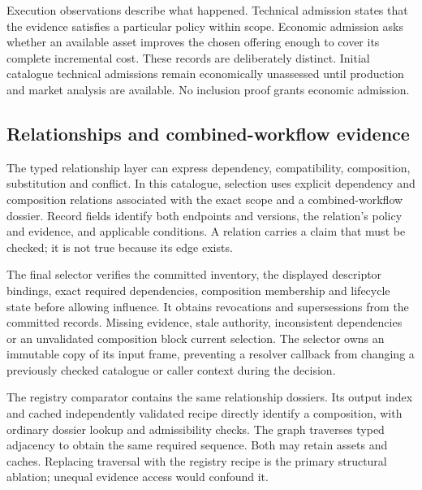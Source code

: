 \documentclass[11pt,a4paper]{article}
\begin{document}
Execution observations describe what happened. Technical admission states that the evidence satisfies a particular policy within scope. Economic admission asks whether an available asset improves the chosen offering enough to cover its complete incremental cost. These records are deliberately distinct. Initial catalogue technical admissions remain economically unassessed until production and market analysis are available. No inclusion proof grants economic admission.

\subsection{Relationships and combined-workflow evidence}
The typed relationship layer can express dependency, compatibility, composition, substitution and conflict. In this catalogue, selection uses explicit dependency and composition relations associated with the exact scope and a combined-workflow dossier. Record fields identify both endpoints and versions, the relation's policy and evidence, and applicable conditions. A relation carries a claim that must be checked; it is not true because its edge exists.

The final selector verifies the committed inventory, the displayed descriptor bindings, exact required dependencies, composition membership and lifecycle state before allowing influence. It obtains revocations and supersessions from the committed records. Missing evidence, stale authority, inconsistent dependencies or an unvalidated composition block current selection. The selector owns an immutable copy of its input frame, preventing a resolver callback from changing a previously checked catalogue or caller context during the decision.

The registry comparator contains the same relationship dossiers. Its output index and cached independently validated recipe directly identify a composition, with ordinary dossier lookup and admissibility checks. The graph traverses typed adjacency to obtain the same required sequence. Both may retain assets and caches. Replacing traversal with the registry recipe is the primary structural ablation; unequal evidence access would confound it.
\end{document}
